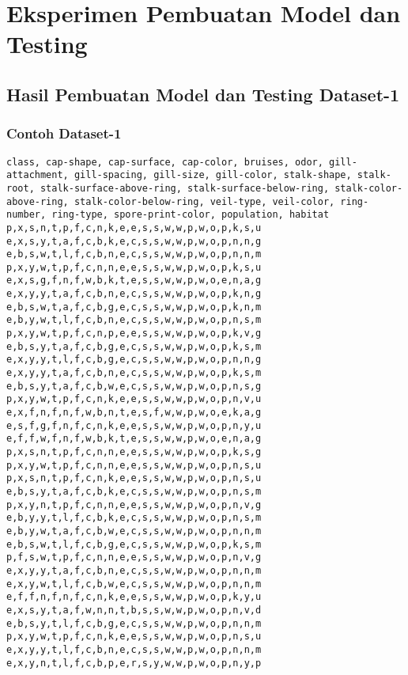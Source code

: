 \chapter{Eksperimen Pembuatan Model dan Testing}
\label{lamp:E}

\section{Hasil Pembuatan Model dan Testing Dataset-1}
\label{lamp:E-Hasil Pembuatan Model dan Testing Dataset-1}

\subsection{Contoh Dataset-1}
\label{lamp:E-Contoh Datase1-1}
\begin{lstlisting}
class, cap-shape, cap-surface, cap-color, bruises, odor, gill-attachment, gill-spacing, gill-size, gill-color, stalk-shape, stalk-root, stalk-surface-above-ring, stalk-surface-below-ring, stalk-color-above-ring, stalk-color-below-ring, veil-type, veil-color, ring-number, ring-type, spore-print-color, population, habitat
p,x,s,n,t,p,f,c,n,k,e,e,s,s,w,w,p,w,o,p,k,s,u
e,x,s,y,t,a,f,c,b,k,e,c,s,s,w,w,p,w,o,p,n,n,g
e,b,s,w,t,l,f,c,b,n,e,c,s,s,w,w,p,w,o,p,n,n,m
p,x,y,w,t,p,f,c,n,n,e,e,s,s,w,w,p,w,o,p,k,s,u
e,x,s,g,f,n,f,w,b,k,t,e,s,s,w,w,p,w,o,e,n,a,g
e,x,y,y,t,a,f,c,b,n,e,c,s,s,w,w,p,w,o,p,k,n,g
e,b,s,w,t,a,f,c,b,g,e,c,s,s,w,w,p,w,o,p,k,n,m
e,b,y,w,t,l,f,c,b,n,e,c,s,s,w,w,p,w,o,p,n,s,m
p,x,y,w,t,p,f,c,n,p,e,e,s,s,w,w,p,w,o,p,k,v,g
e,b,s,y,t,a,f,c,b,g,e,c,s,s,w,w,p,w,o,p,k,s,m
e,x,y,y,t,l,f,c,b,g,e,c,s,s,w,w,p,w,o,p,n,n,g
e,x,y,y,t,a,f,c,b,n,e,c,s,s,w,w,p,w,o,p,k,s,m
e,b,s,y,t,a,f,c,b,w,e,c,s,s,w,w,p,w,o,p,n,s,g
p,x,y,w,t,p,f,c,n,k,e,e,s,s,w,w,p,w,o,p,n,v,u
e,x,f,n,f,n,f,w,b,n,t,e,s,f,w,w,p,w,o,e,k,a,g
e,s,f,g,f,n,f,c,n,k,e,e,s,s,w,w,p,w,o,p,n,y,u
e,f,f,w,f,n,f,w,b,k,t,e,s,s,w,w,p,w,o,e,n,a,g
p,x,s,n,t,p,f,c,n,n,e,e,s,s,w,w,p,w,o,p,k,s,g
p,x,y,w,t,p,f,c,n,n,e,e,s,s,w,w,p,w,o,p,n,s,u
p,x,s,n,t,p,f,c,n,k,e,e,s,s,w,w,p,w,o,p,n,s,u
e,b,s,y,t,a,f,c,b,k,e,c,s,s,w,w,p,w,o,p,n,s,m
p,x,y,n,t,p,f,c,n,n,e,e,s,s,w,w,p,w,o,p,n,v,g
e,b,y,y,t,l,f,c,b,k,e,c,s,s,w,w,p,w,o,p,n,s,m
e,b,y,w,t,a,f,c,b,w,e,c,s,s,w,w,p,w,o,p,n,n,m
e,b,s,w,t,l,f,c,b,g,e,c,s,s,w,w,p,w,o,p,k,s,m
p,f,s,w,t,p,f,c,n,n,e,e,s,s,w,w,p,w,o,p,n,v,g
e,x,y,y,t,a,f,c,b,n,e,c,s,s,w,w,p,w,o,p,n,n,m
e,x,y,w,t,l,f,c,b,w,e,c,s,s,w,w,p,w,o,p,n,n,m
e,f,f,n,f,n,f,c,n,k,e,e,s,s,w,w,p,w,o,p,k,y,u
e,x,s,y,t,a,f,w,n,n,t,b,s,s,w,w,p,w,o,p,n,v,d
e,b,s,y,t,l,f,c,b,g,e,c,s,s,w,w,p,w,o,p,n,n,m
p,x,y,w,t,p,f,c,n,k,e,e,s,s,w,w,p,w,o,p,n,s,u
e,x,y,y,t,l,f,c,b,n,e,c,s,s,w,w,p,w,o,p,n,n,m
e,x,y,n,t,l,f,c,b,p,e,r,s,y,w,w,p,w,o,p,n,y,p
\end{lstlisting}


